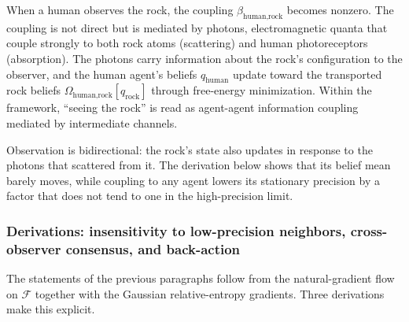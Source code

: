 \documentclass[11pt]{article}
\begin{document}
When a human observes the rock, the coupling $\beta_{\text{human,rock}}$ becomes nonzero. The coupling is not direct but is mediated by photons, electromagnetic quanta that couple strongly to both rock atoms (scattering) and human photoreceptors (absorption). The photons carry information about the rock's configuration to the observer, and the human agent's beliefs $q_{\text{human}}$ update toward the transported rock beliefs $\Omega_{\text{human,rock}}[q_{\text{rock}}]$ through free-energy minimization. Within the framework, ``seeing the rock'' is read as agent-agent information coupling mediated by intermediate channels.

Observation is bidirectional: the rock's state also updates in response to the photons that scattered from it. The derivation below shows that its belief mean barely moves, while coupling to any agent lowers its stationary precision by a factor that does not tend to one in the high-precision limit.

\subsubsection{Derivations: insensitivity to low-precision neighbors, cross-observer consensus, and back-action}
\label{sec:rock_derivations}

The statements of the previous paragraphs follow from the natural-gradient flow on $\mathcal{F}$ together with the Gaussian relative-entropy gradients. Three derivations make this explicit.
\end{document}
